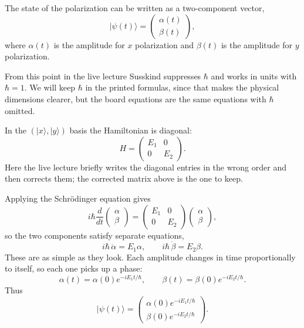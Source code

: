 The state of the polarization can be written as a two-component vector,
\begin{equation}
|\psi(t)\rangle=
\begin{pmatrix}
\alpha(t)\\
\beta(t)
\end{pmatrix},
\end{equation}
where $\alpha(t)$ is the amplitude for $x$ polarization and $\beta(t)$ is the amplitude for $y$ polarization.

From this point in the live lecture Susskind suppresses $\hbar$ and works in units with $\hbar=1$. We will keep $\hbar$ in the printed formulas, since that makes the physical dimensions clearer, but the board equations are the same equations with $\hbar$ omitted.

In the $(|x\rangle,|y\rangle)$ basis the Hamiltonian is diagonal:
\begin{equation}
H=
\begin{pmatrix}
E_1 & 0\\
0 & E_2
\end{pmatrix}.
\end{equation}
Here the live lecture briefly writes the diagonal entries in the wrong order and then corrects them; the corrected matrix above is the one to keep.

Applying the Schr\"odinger equation gives
\begin{equation}
i\hbar\frac{d}{dt}
\begin{pmatrix}
\alpha\\
\beta
\end{pmatrix}
=
\begin{pmatrix}
E_1 & 0\\
0 & E_2
\end{pmatrix}
\begin{pmatrix}
\alpha\\
\beta
\end{pmatrix},
\end{equation}
so the two components satisfy separate equations,
\begin{equation}
i\hbar\,\dot\alpha=E_1\alpha,
\qquad
i\hbar\,\dot\beta=E_2\beta.
\end{equation}
These are as simple as they look. Each amplitude changes in time proportionally to itself, so each one picks up a phase:
\begin{equation}
\alpha(t)=\alpha(0)e^{-iE_1 t/\hbar},
\qquad
\beta(t)=\beta(0)e^{-iE_2 t/\hbar}.
\end{equation}
Thus
\begin{equation}
|\psi(t)\rangle=
\begin{pmatrix}
\alpha(0)e^{-iE_1 t/\hbar}\\
\beta(0)e^{-iE_2 t/\hbar}
\end{pmatrix}.
\end{equation}

